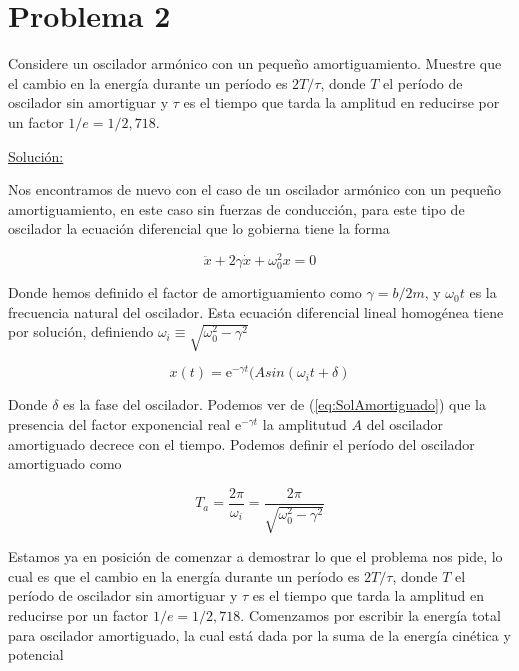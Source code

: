 \documentclass[a4paper,10pt]{article}
\numberwithin{equation}{section}
\newcommand{\euler}{\mathrm{e}}
\begin{document}
\vspace{.3cm}

\section{Problema 2}

Considere un oscilador armónico con un pequeño amortiguamiento.
Muestre que el cambio en la energía durante un período es $2T/\tau$,
donde $T$ el período de oscilador sin amortiguar y $\tau$ es el tiempo
que tarda la amplitud en reducirse por un factor $1/e=1/2,718$.

\vspace{.3cm}

\underline{Solución:} \vspace{.3cm}

Nos encontramos de nuevo con el caso de un oscilador armónico con un pequeño amortiguamiento,
en este caso sin fuerzas de conducción, para este tipo de oscilador la ecuación diferencial
que lo gobierna tiene la forma 

\begin{equation}
 \ddot{x} + 2 \gamma \dot{x} + \omega_0^2 x = 0 
 \label{eq:ODEAmortiguado}
\end{equation}

Donde hemos definido el factor de amortiguamiento como $\gamma = b/2m$, y $\omega_0t$ 
es la frecuencia natural del oscilador. Esta ecuación diferencial lineal homogénea tiene
por solución, definiendo $\omega_i \equiv \sqrt{\omega_0^2 - \gamma^2}$

\begin{equation}
 x(t) = \euler^{-\gamma t} (A sin(\omega_i t + \delta)
 \label{eq:SolAmortiguado}
\end{equation}

Donde $\delta$ es la fase del oscilador. Podemos ver de (\ref{eq:SolAmortiguado}) que
la presencia del factor exponencial real $\euler^{-\gamma t}$ la amplitutud $A$ 
del oscilador amortiguado decrece con el tiempo. Podemos definir el período del oscilador
amortiguado como

\begin{equation}
 T_a = \frac{2\pi}{\omega_i} = \frac{2\pi}{\sqrt{\omega_0^2-\gamma^2}}
 \label{eq:PeriodoAmortiguado1}
\end{equation}

Estamos ya en posición de comenzar a demostrar lo que el problema nos pide, lo cual es
que el cambio en la energía durante un período es $2T/\tau$,
donde $T$ el período de oscilador sin amortiguar y $\tau$ es el tiempo
que tarda la amplitud en reducirse por un factor $1/e=1/2,718$. Comenzamos por 
escribir la energía total para oscilador amortiguado, la cual está dada por la suma
de la energía cinética y potencial
\end{document}

